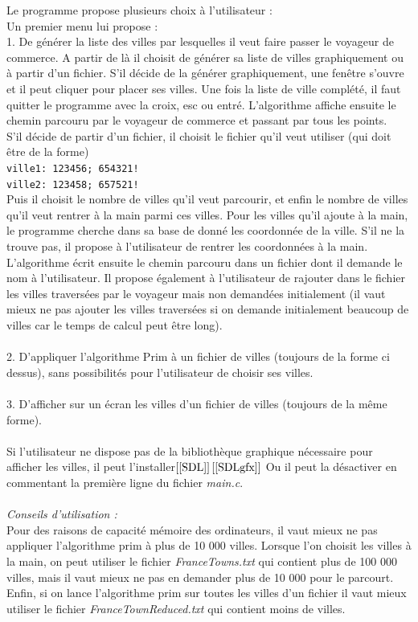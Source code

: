 \documentclass[a4paper,11pt]{article}
\begin{document}
Le programme propose plusieurs choix à l'utilisateur :\\
Un premier menu lui propose :\\
1. De générer la liste des villes par lesquelles il veut faire passer le voyageur de commerce.
A partir de là il choisit de générer sa liste de villes graphiquement ou à partir d'un fichier. S'il décide de la générer graphiquement, une fenêtre s'ouvre et il peut cliquer pour placer ses villes. Une fois la liste de ville complété, il faut quitter le programme avec la croix, esc ou entré. L'algorithme affiche ensuite le chemin parcouru par le voyageur de commerce et passant par tous les points.\\
S'il décide de partir d'un fichier, il choisit le fichier qu'il veut utiliser (qui doit être de la forme) \\
\texttt{ville1: 123456; 654321!}\\
\texttt{ville2: 123458; 657521!}\\
Puis il choisit le nombre de villes qu'il veut parcourir, et enfin le nombre de villes qu'il veut rentrer à la main parmi ces villes. Pour les villes qu'il ajoute à la main, le programme cherche dans sa base de donné les coordonnée de la ville. S'il ne la trouve pas, il propose à l'utilisateur de rentrer les coordonnées à la main. L'algorithme écrit ensuite le chemin parcouru dans un fichier dont il demande le nom à l'utilisateur. Il propose également à l'utilisateur de rajouter dans le fichier les villes traversées par le voyageur mais non demandées initialement (il vaut mieux ne pas ajouter les villes traversées si on demande initialement beaucoup de villes car le temps de calcul peut être long).\\
\\
2. D'appliquer l'algorithme Prim à un fichier de villes (toujours de la forme ci dessus), sans possibilités pour l'utilisateur de choisir ses villes.\\
\\
3. D'afficher sur un écran les villes d'un fichier de villes (toujours de la même forme).\\
\\
Si l'utilisateur ne dispose pas de la bibliothèque graphique nécessaire pour afficher les villes, il peut l'installer$\left[\ref{SDL}\right]\left[\ref{SDLgfx}\right]$ Ou il peut la désactiver en commentant la première ligne du fichier \textit{main.c}.\\
\\
\textit{Conseils d'utilisation : }\\
Pour des raisons de capacité mémoire des ordinateurs, il vaut mieux ne pas appliquer l'algorithme prim à plus de 10 000 villes.
Lorsque l'on choisit les villes à la main, on peut utiliser le fichier \textit{FranceTowns.txt} qui contient plus de 100 000 villes, mais il vaut mieux ne pas en demander plus de 10 000 pour le parcourt.
Enfin, si on lance l'algorithme prim sur toutes les villes d'un fichier il vaut mieux utiliser le fichier \textit{FranceTownReduced.txt} qui contient moins de villes.
\end{document}
